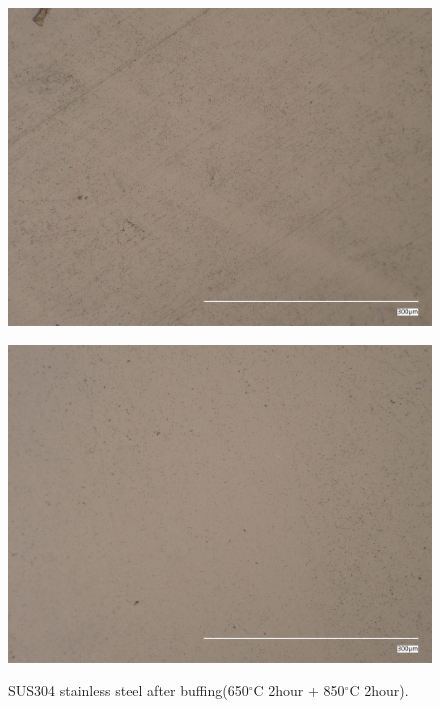 \begin{figure}[htbp]
    \begin{minipage}[htbp]{0.45\linewidth}
      \centering
      \includegraphics[keepaspectratio, scale=0.07]{fig/241218_304650C2h850C2h_3um.jpg}
      \label{fig:8503um}
    \end{minipage}
    \begin{minipage}[htbp]{0.45\linewidth}
      \centering
      \includegraphics[keepaspectratio, scale=0.07]{fig/241218_304650C2h850C2h_1um.jpg}
      \label{fig:8501um}
    \end{minipage}
    \centering
    \caption{SUS304 stainless steel after buffing(650$^\circ$C 2hour + 850$^\circ$C 2hour).}
    \label{fig:304850Buff}
\end{figure}
